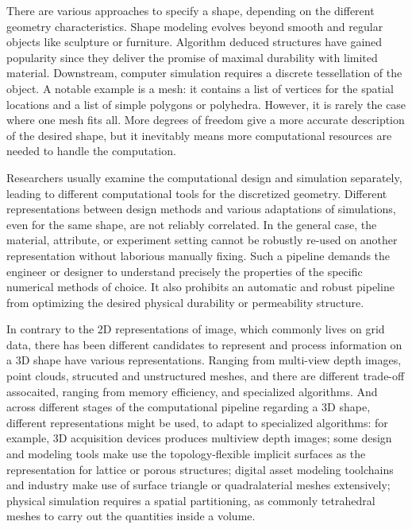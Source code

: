 There are various approaches to specify a shape, depending on the different geometry characteristics. Shape modeling evolves beyond smooth and regular objects like sculpture or furniture. Algorithm deduced structures have gained popularity since they deliver the promise of maximal durability with limited material. Downstream, computer simulation requires a discrete tessellation of the object. A notable example is a mesh: it contains a list of vertices for the spatial locations and a list of simple polygons or polyhedra. However, it is rarely the case where one mesh fits all. More degrees of freedom give a more accurate description of the desired shape, but it inevitably means more computational resources are needed to handle the computation.

Researchers usually examine the computational design and simulation separately, leading to different computational tools for the discretized geometry. Different representations between design methods and various adaptations of simulations, even for the same shape, are not reliably correlated. In the general case, the material, attribute, or experiment setting cannot be robustly re-used on another representation without laborious manually fixing. Such a pipeline demands the engineer or designer to understand precisely the properties of the specific numerical methods of choice. It also prohibits an automatic and robust pipeline from optimizing the desired physical durability or permeability structure. 

In contrary to the 2D representations of image, which commonly lives on grid data, there has been different candidates to represent and process information on a 3D shape have various representations. Ranging from multi-view depth images, point clouds, strucuted and unstructured meshes, and  there are different trade-off assocaited, ranging from memory efficiency, and specialized algorithms. And across different stages of the computational pipeline regarding a 3D shape, different representations might be used, to adapt to specialized algorithms: for example, 3D acquisition devices produces multiview depth images; some design and modeling tools make use the topology-flexible implicit surfaces as the representation for lattice or porous structures; digital asset modeling toolchains and industry make use of surface triangle or quadralaterial meshes extensively; physical simulation requires a spatial partitioning, as commonly tetrahedral meshes to carry out the quantities inside a volume. 


